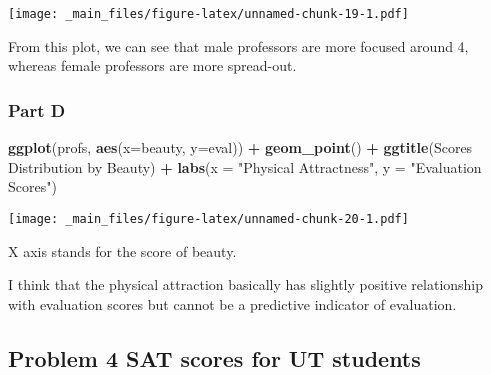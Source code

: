 \documentclass[
]{article}
\newenvironment{Shaded}{\begin{snugshade}}{\end{snugshade}}
\newcommand{\AttributeTok}[1]{\textcolor[rgb]{0.13,0.29,0.53}{#1}}
\newcommand{\FunctionTok}[1]{\textcolor[rgb]{0.13,0.29,0.53}{\textbf{#1}}}
\newcommand{\NormalTok}[1]{#1}
\newcommand{\SpecialCharTok}[1]{\textcolor[rgb]{0.81,0.36,0.00}{\textbf{#1}}}
\newcommand{\StringTok}[1]{\textcolor[rgb]{0.31,0.60,0.02}{#1}}
\begin{document}
\texttt{[image: \_main\_files/figure-latex/unnamed-chunk-19-1.pdf]}

From this plot, we can see that male professors are more focused around 4, whereas female professors are more spread-out.

\hypertarget{part-d}{%
\subsubsection{Part D}\label{part-d}}

\begin{Shaded}
\begin{Highlighting}[]
\FunctionTok{ggplot}\NormalTok{(profs, }\FunctionTok{aes}\NormalTok{(}\AttributeTok{x=}\NormalTok{beauty, }\AttributeTok{y=}\NormalTok{eval)) }\SpecialCharTok{+} \FunctionTok{geom\_point}\NormalTok{() }\SpecialCharTok{+} \FunctionTok{ggtitle}\NormalTok{(}\StringTok{\textquotesingle{}Scores Distribution by Beauty\textquotesingle{}}\NormalTok{) }\SpecialCharTok{+} \FunctionTok{labs}\NormalTok{(}\AttributeTok{x =} \StringTok{"Physical Attractness"}\NormalTok{, }\AttributeTok{y =} \StringTok{"Evaluation Scores"}\NormalTok{)}
\end{Highlighting}
\end{Shaded}

\texttt{[image: \_main\_files/figure-latex/unnamed-chunk-20-1.pdf]}

X axis stands for the score of beauty.

I think that the physical attraction basically has slightly positive relationship with evaluation scores but cannot be a predictive indicator of evaluation.

\hypertarget{problem-4-sat-scores-for-ut-students}{%
\subsection{Problem 4 SAT scores for UT students}\label{problem-4-sat-scores-for-ut-students}}
\end{document}
